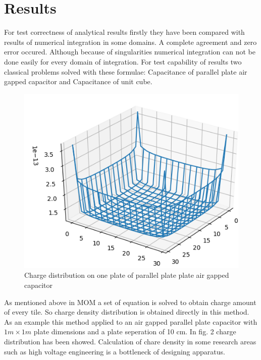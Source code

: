 \documentclass[twoside,twocolumn]{article}
\begin{document}
\section{Results}
For test correctness of analytical results firstly they have been compared with results of numerical integration in some domains. A complete agreement and zero error occured. Although because of singularities numerical integration can not be done easily for every domain of integration. For test capability of results two classical problems solved with these formulae: Capacitance of parallel plate air gapped capacitor and Capacitance of unit cube.


\begin {figure}[h]
	\center
	\includegraphics[width=\linewidth]	{wired.png}
	\caption{Charge distribution on one plate of parallel plate plate air gapped capacitor}
\end{figure}
As mentioned above in MOM a set of equation is solved to obtain charge amount of every tile. So charge density distribution is obtained directly in this method. As an example this method applied to an air gapped parallel plate capacitor with  $1m \times 1m $ plate dimensions and a plate seperation of 10 cm. In fig. 2 charge distribution has been showed. Calculation of chare density in some research areas such as high voltage engineering is a bottleneck of designing apparatus.
\end{document}
